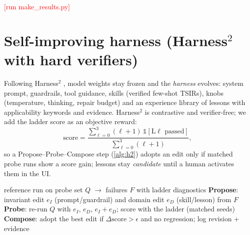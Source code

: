 \documentclass[10pt,a4paper]{article}
\newcommand{\todo}[1]{\textcolor{red}{[#1]}}
\newcommand{\ResultsUCone}{\todo{run make\_results.py}}%
\begin{document}
\ResultsUCone

\section{Self-improving harness (Harness$^2$ with hard verifiers)}
Following Harness$^2$ \cite{harness2}, model weights stay frozen and the \emph{harness} evolves: system prompt,
guardrails, tool guidance, skills (verified few-shot TSIRs), knobs (temperature, thinking, repair budget)
and an experience library of lessons with applicability keywords and evidence. Harness$^2$ is contrastive
and verifier-free; we add the ladder score as an objective reward:
\begin{equation}
\text{score} = \frac{\sum_{\ell=0}^{3} (\ell+1)\,\mathbb{1}[\text{L}\ell \text{ passed}]}{\sum_{\ell=0}^{3}(\ell+1)},
\end{equation}
so a Propose--Probe--Compose step (\cref{alg:h2}) adopts an edit only if matched probe runs show a score gain;
lessons stay \emph{candidate} until a human activates them in the UI.

\begin{algorithm}[h]\caption{Verifier-scored Propose--Probe--Compose}\label{alg:h2}\small
\begin{algorithmic}[1]
\State reference run on probe set $Q$ $\to$ failures $F$ with ladder diagnostics
\State \textbf{Propose}: invariant edit $e_I$ (prompt/guardrail) and domain edit $e_D$ (skill/lesson) from $F$
\State \textbf{Probe}: re-run $Q$ with $e_I$, $e_D$, $e_I\!+\!e_D$; score with the ladder (matched seeds)
\State \textbf{Compose}: adopt the best edit if $\Delta\text{score} > \epsilon$ and no regression; log revision + evidence
\end{algorithmic}
\end{algorithm}

\end{document}
